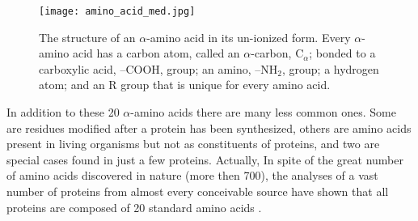 \begin{figure}[h]
\centering
\begin{minipage}[t]{0.8\textwidth}
\centering
\texttt{[image: amino\_acid\_med.jpg]}

\caption{\small{The structure of an $\alpha$-amino acid in its un-ionized form. Every $\alpha$-amino acid has a carbon atom, called an $\alpha$-carbon, C$_\alpha$; bonded to a carboxylic acid, --COOH, group; an amino, --NH$_2$, group; a hydrogen atom; and an R group that is unique for every amino acid. %
}}

\label{fig:AminoAcid}
\end{minipage} 
\end{figure}

In addition to these 20 $\alpha$-amino acids there are many less common ones. Some are residues modified after a protein has been synthesized, others are amino acids present in living organisms but not as constituents of proteins, and two are special cases found in just a few proteins. Actually, In spite of the great number of amino acids discovered in nature (more then 700), the analyses of a vast number of proteins from almost every conceivable source have shown that all proteins are composed of 20 standard amino acids 
\cite{wu2013amino}.

